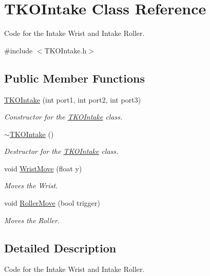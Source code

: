 \hypertarget{class_t_k_o_intake}{\section{T\-K\-O\-Intake Class Reference}
\label{class_t_k_o_intake}
}


Code for the Intake Wrist and Intake Roller.  




{\ttfamily \#include $<$T\-K\-O\-Intake.\-h$>$}

\subsection*{Public Member Functions}
\begin{DoxyCompactItemize}
\item 
\hyperlink{class_t_k_o_intake_a94583d666a5464c20a514712215cfe85}{T\-K\-O\-Intake} (int port1, int port2, int port3)
\begin{DoxyCompactList}\small\item\em Constructor for the \hyperlink{class_t_k_o_intake}{T\-K\-O\-Intake} class. \end{DoxyCompactList}\item 
\hypertarget{class_t_k_o_intake_a7bc74a589c8c66488cb62fb06195f91d}{\hyperlink{class_t_k_o_intake_a7bc74a589c8c66488cb62fb06195f91d}{$\sim$\-T\-K\-O\-Intake} ()}\label{class_t_k_o_intake_a7bc74a589c8c66488cb62fb06195f91d}

\begin{DoxyCompactList}\small\item\em Destructor for the \hyperlink{class_t_k_o_intake}{T\-K\-O\-Intake} class. \end{DoxyCompactList}\item 
void \hyperlink{class_t_k_o_intake_a93c2dd53a27735bd9d3cbfa25139c79f}{Wrist\-Move} (float y)
\begin{DoxyCompactList}\small\item\em Moves the Wrist. \end{DoxyCompactList}\item 
void \hyperlink{class_t_k_o_intake_aea6c16e3049d897c0a5ec60c5da3b52a}{Roller\-Move} (bool trigger)
\begin{DoxyCompactList}\small\item\em Moves the Roller. \end{DoxyCompactList}\end{DoxyCompactItemize}


\subsection{Detailed Description}
Code for the Intake Wrist and Intake Roller. 

